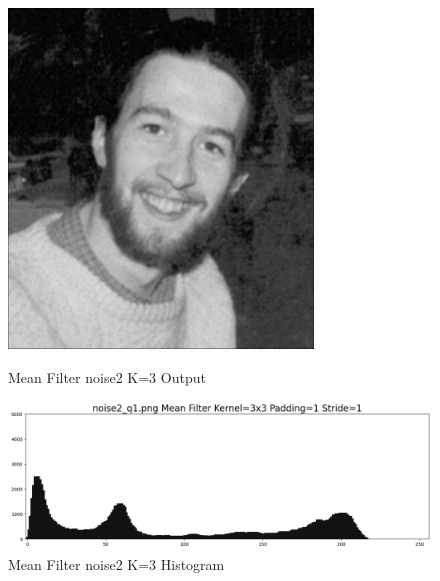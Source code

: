 \documentclass[12pt,a4paper]{report}
\begin{document}
\begin{figure}[!htb]
  \includegraphics[width=1\linewidth]{output/noise2_q1_K3P1.png}
  \caption{Mean Filter noise2 K=3 Output}
  \includegraphics[width=1\linewidth]{output/noise2_q1_K3P1_his.png}
  \caption{Mean Filter noise2 K=3 Histogram}
\end{figure}
\end{document}
